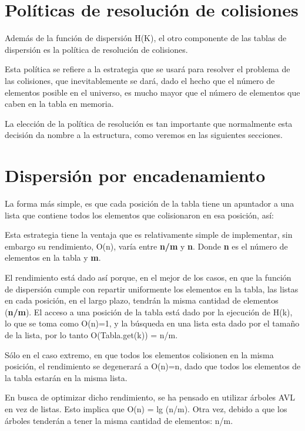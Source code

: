 \section{Políticas de resolución de colisiones}
\label{sec:polit-de-resol}

Además de la función de dispersión H(K), el otro componente de las
tablas de dispersión es la política de resolución de colisiones.

Esta política se refiere a la estrategia que se usará para resolver el
problema de las colisiones, que inevitablemente se dará, dado el hecho
que el número de elementos posible en el universo, es mucho mayor que
el número de elementos que caben en la tabla en memoria.

La elección de la política de resolución es tan importante que
normalmente esta decisión da nombre a la estructura, como veremos en
las siguientes secciones.  

\section{Dispersión por encadenamiento}
\label{sec:disp-por-encad}

La forma más simple, es que cada posición de la tabla tiene un
apuntador a una lista que contiene todos los elementos que
colisionaron en esa posición, así:

Esta estrategia tiene la ventaja que es relativamente simple de
implementar, sin embargo su rendimiento, O(n), varía entre
\textbf{n/m} y \textbf{n}. Donde \textbf{n} es el número de elementos
en la tabla y \textbf{m}.

El rendimiento está dado así porque, en el mejor de los casos, en que
la función de dispersión cumple con repartir uniformente los elementos
en la tabla, las listas en cada posición, en el largo plazo, tendrán
la misma cantidad de elementos (\textbf{n/m}).  El acceso a una
posición de la tabla está dado por la ejecución de H(k), lo que se
toma como O(n)=1, y la búsqueda en una lista esta dado por el tamaño
de la lista, por lo tanto O(Tabla.get(k)) = n/m.

Sólo en el caso extremo, en que todos los elementos colisionen en la
misma posición, el rendimiento se degenerará a O(n)=n, dado que todos
los elementos de la tabla estarán en la misma lista.

En busca de optimizar dicho rendimiento, se ha pensado en utilizar
árboles AVL en vez de listas.  Esto implica que O(n) = lg (n/m).  Otra
vez, debido a que los árboles tenderán a tener la misma cantidad de
elementos: n/m.

